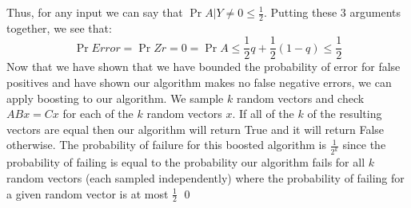 \documentclass[12pt]{article}
\begin{document}
\begin{solution}
\begin{solution}
\begin{itemize}
    Thus, for any input we can say that $\Pr{A|Y\neq0} \leq \frac{1}{2}$. Putting these $3$ arguments together, we see that:
    \[
    \Pr{Error} = \Pr{Zr=0} = \Pr{A} \leq \frac{1}{2}q + \frac{1}{2}(1-q) \leq \frac{1}{2}
    \]
    Now that we have shown that we have bounded the probability of error for false positives and have shown our algorithm makes no false negative errors, we can apply boosting to our algorithm. We sample $k$ random vectors and check $ABx = Cx$ for each of the $k$ random vectors $x$. If all of the $k$ of the resulting vectors are equal then our algorithm will return True and it will return False otherwise. The probability of failure for this boosted algorithm is $\frac{1}{2^k}$ since the probability of failing is equal to the probability our algorithm fails for all $k$ random vectors (each sampled independently) where the probability of failing for a given random vector is at most $\frac{1}{2}$ \qed
    
\end{itemize}
\end{solution}


\end{solution}
\end{document}
